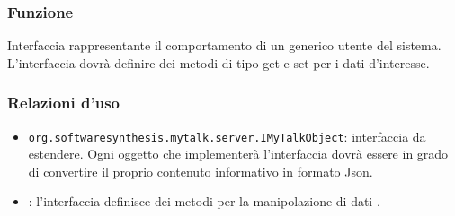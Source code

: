 
\subsubsection*{Funzione}
Interfaccia rappresentante il comportamento di un generico utente del sistema. L'interfaccia dovrà definire dei metodi di tipo get e set per i dati d'interesse.

\subsubsection*{Relazioni d'uso}

\begin{itemize}
	\item \texttt{org.softwaresynthesis.mytalk.server.IMyTalkObject}: interfaccia da estendere. Ogni oggetto che implementerà l'interfaccia  dovrà essere in grado di convertire il proprio contenuto informativo in formato Json.
	\item {}: l'interfaccia definisce dei metodi per la manipolazione di dati .
\end{itemize}

